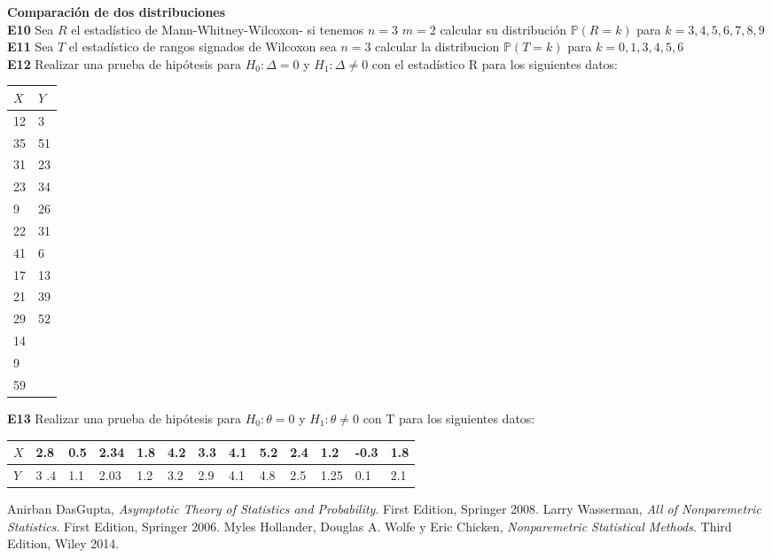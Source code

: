 \documentclass[11pt,spanish]{article}
\begin{document}
\textbf{Comparación de dos distribuciones}\\
\textbf{E10} Sea $R$ el estadístico de Mann-Whitney-Wilcoxon- si tenemos $n=3$ $m=2$ calcular su distribución $\mathbb{P}(R=k)$ para $k=3,4,5,6,7,8,9$\\
\textbf{E11} Sea $T$ el estadístico de rangos signados de Wilcoxon sea $n=3$ calcular la distribucion $\mathbb{P}(T=k)$ para $k=0,1,3,4,5,6$\\
\textbf{E12} Realizar una prueba de hipótesis para $H_0:\Delta =0$ y $H_1:\Delta \neq 0$ con el estadístico R para los siguientes datos: 
\begin{center}
\begin{tabular}{l|l}
$X$ & $Y$ \\ \hline \hline
12  & 3   \\ \hline
35  & 51  \\ \hline
31  & 23  \\ \hline
23  & 34  \\ \hline
9   & 26  \\ \hline
22  & 31  \\ \hline
41  & 6   \\ \hline
17  & 13  \\ \hline
21  & 39  \\ \hline
29  & 52  \\ \hline
14  &     \\ \hline
9   &     \\ \hline
59  &     \\ \hline
\end{tabular}
\end{center}
\textbf{E13} Realizar una prueba de hipótesis para $H_0:\theta =0$ y $H_1:\theta \neq 0$ con T para los siguientes datos: 
\begin{center}
\begin{tabular}{l||llllllllllll}
$X$ & 2.8 & 0.5 & 2.34 & 1.8 & 4.2 & 3.3 & 4.1 & 5.2 & 2.4 &1.2 & -0.3 &1.8\\ \hline 
$Y$ & 3 .4& 1.1 & 2.03 & 1.2 & 3.2 & 2.9 & 4.1 & 4.8 & 2.5 &1.25 & 0.1 &2.1\\ 
\end{tabular}
\end{center}
\begin{thebibliography}{9}
Anirban DasGupta, \textit{Asymptotic Theory of Statistics and Probability}. 
First Edition, Springer 2008.
Larry Wasserman, \textit{All of Nonparemetric Statistics}. 
First Edition, Springer 2006.
Myles Hollander, Douglas A. Wolfe y Eric Chicken, \textit{Nonparemetric Statistical Methods}. 
Third Edition, Wiley 2014.
\end{thebibliography}
\end{document}
